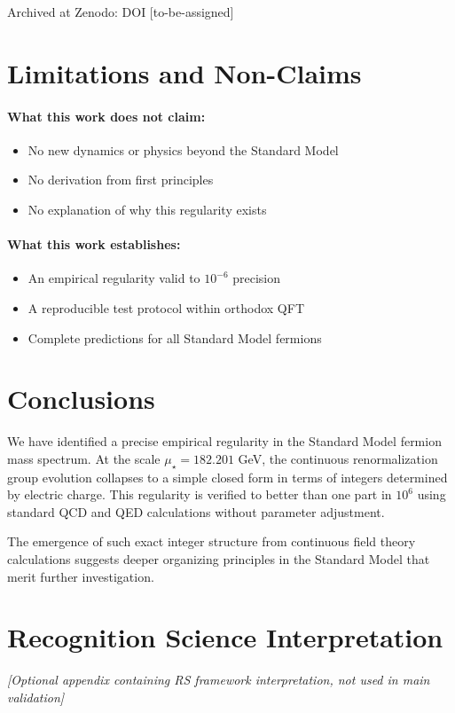 \documentclass[11pt]{article}
\begin{document}
Archived at Zenodo: DOI [to-be-assigned]

\section{Limitations and Non-Claims}

\paragraph{What this work does not claim:}
\begin{itemize}
\item No new dynamics or physics beyond the Standard Model
\item No derivation from first principles
\item No explanation of why this regularity exists
\end{itemize}

\paragraph{What this work establishes:}
\begin{itemize}
\item An empirical regularity valid to $10^{-6}$ precision
\item A reproducible test protocol within orthodox QFT
\item Complete predictions for all Standard Model fermions
\end{itemize}

\section{Conclusions}

We have identified a precise empirical regularity in the Standard Model fermion mass spectrum. At the scale $\mu_\star = 182.201$ GeV, the continuous renormalization group evolution collapses to a simple closed form in terms of integers determined by electric charge. This regularity is verified to better than one part in $10^6$ using standard QCD and QED calculations without parameter adjustment.

The emergence of such exact integer structure from continuous field theory calculations suggests deeper organizing principles in the Standard Model that merit further investigation.

\appendix
\section{Recognition Science Interpretation}
\textit{[Optional appendix containing RS framework interpretation, not used in main validation]}
\end{document}
